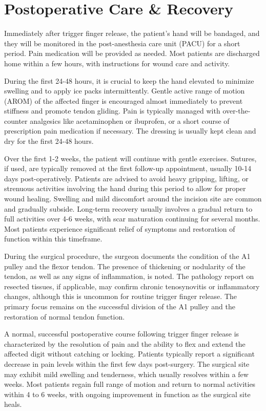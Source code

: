 \section*{Postoperative Care \& Recovery}
Immediately after trigger finger release, the patient's hand will be bandaged, and they will be monitored in the post-anesthesia care unit (PACU) for a short period. Pain medication will be provided as needed. Most patients are discharged home within a few hours, with instructions for wound care and activity.

During the first 24-48 hours, it is crucial to keep the hand elevated to minimize swelling and to apply ice packs intermittently. Gentle active range of motion (AROM) of the affected finger is encouraged almost immediately to prevent stiffness and promote tendon gliding. Pain is typically managed with over-the-counter analgesics like acetaminophen or ibuprofen, or a short course of prescription pain medication if necessary. The dressing is usually kept clean and dry for the first 24-48 hours.

Over the first 1-2 weeks, the patient will continue with gentle exercises. Sutures, if used, are typically removed at the first follow-up appointment, usually 10-14 days post-operatively. Patients are advised to avoid heavy gripping, lifting, or strenuous activities involving the hand during this period to allow for proper wound healing. Swelling and mild discomfort around the incision site are common and gradually subside. Long-term recovery usually involves a gradual return to full activities over 4-6 weeks, with scar maturation continuing for several months. Most patients experience significant relief of symptoms and restoration of function within this timeframe.

During the surgical procedure, the surgeon documents the condition of the A1 pulley and the flexor tendon. The presence of thickening or nodularity of the tendon, as well as any signs of inflammation, is noted. The pathology report on resected tissues, if applicable, may confirm chronic tenosynovitis or inflammatory changes, although this is uncommon for routine trigger finger release. The primary focus remains on the successful division of the A1 pulley and the restoration of normal tendon function.

A normal, successful postoperative course following trigger finger release is characterized by the resolution of pain and the ability to flex and extend the affected digit without catching or locking. Patients typically report a significant decrease in pain levels within the first few days post-surgery. The surgical site may exhibit mild swelling and tenderness, which usually resolves within a few weeks. Most patients regain full range of motion and return to normal activities within 4 to 6 weeks, with ongoing improvement in function as the surgical site heals.

